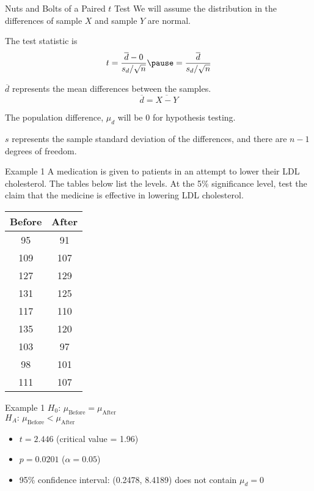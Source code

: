 \documentclass[t]{beamer}
\begin{document}
\begin{frame}{Nuts and Bolts of a Paired $t$ Test}
We will assume the distribution in the differences of sample $X$ and sample $Y$ are normal.	\newline\\	\pause

The test statistic is
\[t = \frac{\overline{d} - 0}{s_d / \sqrt{n}} \pause = 	\frac{\overline{d}}{s_d / \sqrt{n}} \]		\pause

$\overline{d}$ represents the mean differences between the samples. \[\overline{d} = \overline{X-Y}\]		\pause

The population difference, $\mu_d$ will be 0 for hypothesis testing.	\newline\\	\pause

$s$ represents the sample standard deviation of the differences, and there are $n-1$ degrees of freedom.
\end{frame}

\begin{frame}{Example 1}
A medication is given to patients in an attempt to lower their LDL cholesterol. The tables below list the levels. At the 5\% significance level, test the claim that the medicine is effective in lowering LDL cholesterol.	\newline\\
\begin{tabular}{c|c}
\textbf{Before} & \textbf{After} \\ \hline
95 & 91 \\
109 & 107 \\
127 & 129 \\
131 & 125 \\
117 & 110 \\
135 & 120 \\
103 & 97 \\
98 & 101 \\
111 & 107 \\
\end{tabular}
\end{frame}

\begin{frame}{Example 1}
$H_0: \, \mu_{\text{Before}} = \mu_{\text{After}}$	\newline\\
$H_A: \, \mu_{\text{Before}} < \mu_{\text{After}}$	\newline\\	\pause
\begin{itemize}
	\item $t = 2.446$ \quad \pause (critical value = 1.96)	\newline\\	\pause
	\item $p = 0.0201$ \quad \pause ($\alpha = 0.05$) \newline\\	\pause
	\item 95\% confidence interval: (0.2478, 8.4189) \quad \pause does not contain $\mu_d = 0$
\end{itemize}
\end{frame}
\end{document}
